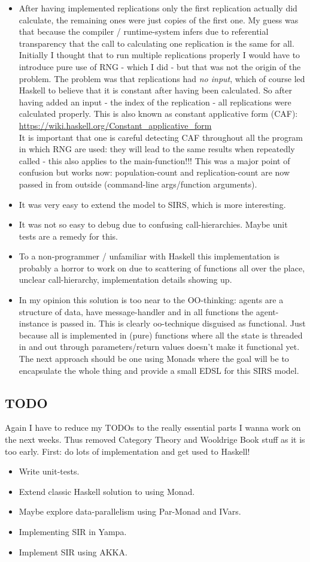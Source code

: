 \begin{itemize}
\item After having implemented replications only the first replication actually did calculate, the remaining ones were just copies of the first one. My guess was that because the compiler / runtime-system infers due to referential transparency that the call to calculating one replication is the same for all. Initially I thought that to run multiple replications properly I would have to introduce pure use of RNG - which I did - but that was not the origin of the problem. The problem was that replications had \textit{no input}, which of course led Haskell to believe that it is constant after having been calculated. So after having added an input - the index of the replication - all replications were calculated properly. This is also known as constant applicative form (CAF): \url{https://wiki.haskell.org/Constant_applicative_form} \\
It is important that one is careful detecting CAF throughout all the program in which RNG are used: they will lead to the same results when repeatedly called - this also applies to the main-function!!! This was a major point of confusion but works now: population-count and replication-count are now passed in from outside (command-line args/function arguments).
\item It was very easy to extend the model to SIRS, which is more interesting.
\item It was not so easy to debug due to confusing call-hierarchies. Maybe unit tests are a remedy for this.
\item To a non-programmer / unfamiliar with Haskell this implementation is probably a horror to work on due to scattering of functions all over the place, unclear call-hierarchy, implementation details showing up.
\item In my opinion this solution is too near to the OO-thinking: agents are a structure of data, have message-handler and in all functions the agent-instance is passed in. This is clearly oo-technique disguised as functional. Just because all is implemented in (pure) functions where all the state is threaded in and out through parameters/return values doesn't make it functional yet. The next approach should be one using Monads where the goal will be to encapsulate the whole thing and provide a small EDSL for this SIRS model.
\end{itemize}

\subsection*{TODO}
Again I have to reduce my TODOs to the really essential parts I wanna work on the next weeks. Thus removed Category Theory and Wooldrige Book stuff as it is too early. First: do lots of implementation and get used to Haskell!

\begin{itemize}
\item Write unit-tests.
\item Extend classic Haskell solution to using Monad.
\item Maybe explore data-parallelism using Par-Monad and IVars.
\item Implementing SIR in Yampa.
\item Implement SIR using AKKA.
\end{itemize}